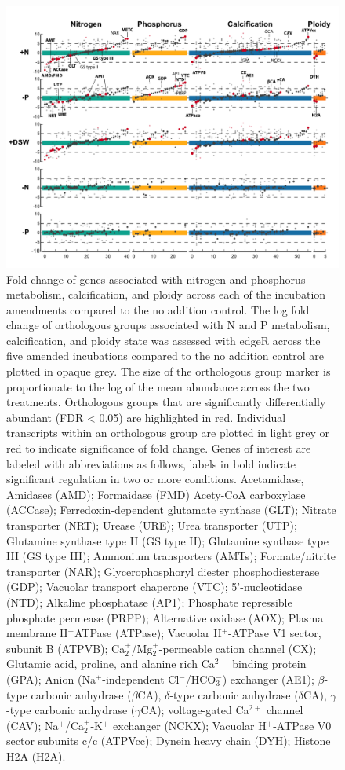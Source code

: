\begin{figure}[p!]
  \centering
    \includegraphics[width=1\textwidth]{Images/C5_Figure4_v1.pdf}
    \caption[Fold change of genes associated with nitrogen and phosphorus metabolism, calcification, and ploidy across each of the incubation amendments compared to the no addition control]{Fold change of genes associated with nitrogen and phosphorus metabolism, calcification, and ploidy across each of the incubation amendments compared to the no addition control. The log fold change of orthologous groups associated with N and P metabolism, calcification, and ploidy state was assessed with edgeR across the five amended incubations compared to the no addition control are plotted in opaque grey. The size of the orthologous group marker is proportionate to the log of the mean abundance across the two treatments. Orthologous groups that are significantly differentially abundant (FDR < 0.05) are highlighted in red. Individual transcripts within an orthologous group are plotted in light grey or red to indicate significance of fold change. Genes of interest are labeled with abbreviations as follows, labels in bold indicate significant regulation in two or more conditions. Acetamidase, Amidases (AMD); Formaidase (FMD) Acety-CoA carboxylase (ACCase); Ferredoxin-dependent glutamate synthase (GLT); Nitrate transporter (NRT); Urease (URE); Urea transporter (UTP); Glutamine synthase type II (GS type II); Glutamine synthase type III (GS type III); Ammonium transporters (AMTs); Formate/nitrite transporter (NAR); Glycerophosphoryl diester phosphodiesterase (GDP); Vacuolar transport chaperone (VTC); 5'-nucleotidase (NTD); Alkaline phosphatase (AP1); Phosphate repressible phosphate permease (PRPP); Alternative oxidase (AOX); Plasma membrane H$^+$ATPase (ATPase); Vacuolar H$^+$-ATPase V1 sector, subunit B (ATPVB); Ca$_{2}^+$/Mg$_{2}^+$-permeable cation channel (CX); Glutamic acid, proline, and alanine rich Ca$^{2+}$ binding protein (GPA); Anion (Na$^+$-independent Cl$^-$/HCO$_{3}^-$) exchanger (AE1); $\beta$-type carbonic anhydrase ($\beta$CA), $\delta$-type carbonic anhydrase ($\delta$CA), $\gamma$-type carbonic anhydrase ($\gamma$CA); voltage-gated Ca$^{2+}$ channel (CAV); Na$^+$/Ca$_{2}^+$-K$^+$ exchanger (NCKX); Vacuolar H$^+$-ATPase V0 sector subunits c/c (ATPVcc); Dynein heavy chain (DYH); Histone H2A (H2A).}

\end{figure}
